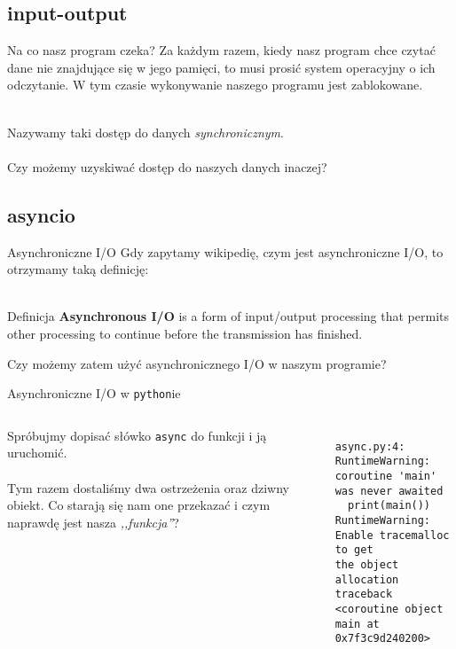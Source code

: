 \documentclass[aspectratio=169]{beamer}
\begin{document}
\subsection{input-output}
\begin{frame}{Na co nasz program czeka?}
  Za każdym razem, kiedy nasz program chce czytać dane nie znajdujące się w
  jego pamięci, to musi prosić system operacyjny o ich odczytanie.
  W tym czasie wykonywanie naszego programu jest zablokowane.\\~\\
  \pause

  Nazywamy taki dostęp do danych \emph{synchronicznym}. \\~\\

  \pause
  Czy możemy uzyskiwać dostęp do naszych danych inaczej?
\end{frame}

\subsection{asyncio}
\begin{frame}{Asynchroniczne I/O}
  Gdy zapytamy wikipedię, czym jest asynchroniczne I/O, to otrzymamy taką
  definicję:\\~\\

  \begin{block}{Definicja}
    \textbf{Asynchronous I/O} is a form of input/output processing that permits 
    other processing to continue before the transmission has finished.
  \end{block}
  \pause

  Czy możemy zatem użyć asynchronicznego I/O w naszym programie?
\end{frame}

\begin{frame}[fragile]{Asynchroniczne I/O w \texttt{python}ie}
  \begin{columns}
    \begin{column}{.48\textwidth}
      Spróbujmy dopisać słówko \texttt{async} do funkcji i ją
      uruchomić.\\~\\

      Tym razem dostaliśmy dwa ostrzeżenia oraz dziwny obiekt. Co starają się
      nam one przekazać i czym naprawdę jest nasza \emph{,,funkcja''}?
    \end{column}
    \begin{column}{.48\textwidth}
      \scriptsize
      \inputminted[linenos]{python}{./examples/async.py}

      \begin{verbatim}
async.py:4: RuntimeWarning: coroutine 'main'
was never awaited
  print(main())
RuntimeWarning: Enable tracemalloc to get 
the object allocation traceback
<coroutine object main at 0x7f3c9d240200>
      \end{verbatim}
    \end{column}
  \end{columns}
\end{frame}
\end{document}
